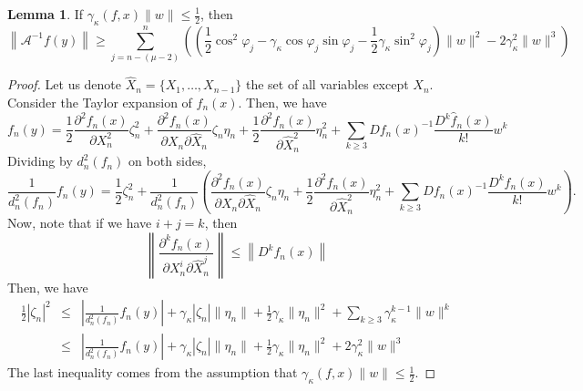 \documentclass[12pt,oneside,reqno]{amsart}
\theoremstyle{definition}
\newtheorem{lem}[thm]{Lemma}
\begin{document}
\begin{lem}\label{lem:inverseOperatorLowerbound}
	If $\gamma_\kappa(f,x)\|w\|\leq \frac{1}{2}$, then 
	\[\left\|\mathcal{A}^{-1}f(y)\right\|\geq \sum\limits_{j=n-(\mu-2)}^n\left(\left(\frac{1}{2}\cos^2\varphi_{j}-\gamma_{\kappa}\cos\varphi_j\sin\varphi_j-\frac{1}{2}\gamma_{\kappa}\sin^2\varphi_j\right)\|w\|^2 -2\gamma_{\kappa}^2\|w\|^3\right)\]
\end{lem}
\begin{proof}
	Let us denote $\hat{X}_n=\{X_1,\dots, X_{n-1}\}$ the set of all variables except $X_n$. Consider the Taylor expansion of $f_{n}(x)$. Then, we have
	{\footnotesize	\[f_{n}(y)=\frac{1}{2}\frac{\partial^2 f_{n}(x)}{\partial X_{n}^2}\zeta_{n}^2+\frac{\partial^2 f_{n}(x)}{\partial X_{n}\partial \hat{X}_n}\zeta_{n}\eta_n+\frac{1}{2}\frac{\partial^2 f_{n}(x)}{\partial\hat{X}_n^2}\eta_n^2 +\sum\limits_{k\geq 3}Df_{n}(x)^{-1}\frac{D^k\hat{f}_{n}(x)}{k!}w^k\]}
	Dividing by $d_{n}^2(f_{n})$ on both sides,
	{\footnotesize \[\frac{1}{d_{n}^2(f_{n})}f_{n}(y)=\frac{1}{2}\zeta_{n}^2+\frac{1}{d_{n}^2(f_{n})}\left(\frac{\partial^2 f_{n}(x)}{\partial X_{n}\partial \hat{X}_n}\zeta_{n}\eta_n+\frac{1}{2}\frac{\partial^2 f_{n}(x)}{\partial\hat{X}_n^2}\eta_n^2 +\sum\limits_{k\geq 3}Df_{n}(x)^{-1}\frac{D^k\hat{f}_{n}(x)}{k!}w^k\right).\]}
	Now, note that if we have $i+j=k$, then
	{\footnotesize\[\left\|\frac{\partial^k f_{n}(x)}{\partial X_{n}^i\partial \hat{X}_n^j}\right\|\leq \left\|D^k f_{n}(x)\right\|\]}
	Then, we have
	{\footnotesize
		\begin{eqnarray*}
			\frac{1}{2}\left|\zeta_{n}\right|^2 &\leq & \left|\frac{1}{d_{n}^2(f_{n})}f_{n}(y)\right| + \gamma_\kappa|\zeta_{n}|\|\eta_n\|+\frac{1}{2}\gamma_\kappa\|\eta_n\|^2 +\sum\limits_{k\geq 3}\gamma_\kappa^{k-1}\|w\|^k\\
			&\leq & \left|\frac{1}{d_{n}^2(f_{n})}f_{n}(y)\right| + \gamma_\kappa|\zeta_{n}|\|\eta_n\|+\frac{1}{2}\gamma_\kappa\|\eta_n\|^2 +2\gamma_\kappa^{2}\|w\|^3
		\end{eqnarray*}
	}
	The last inequality comes from the assumption that $\gamma_\kappa(f,x)\|w\|\leq \frac{1}{2}$.
	

\end{proof}
\end{document}
